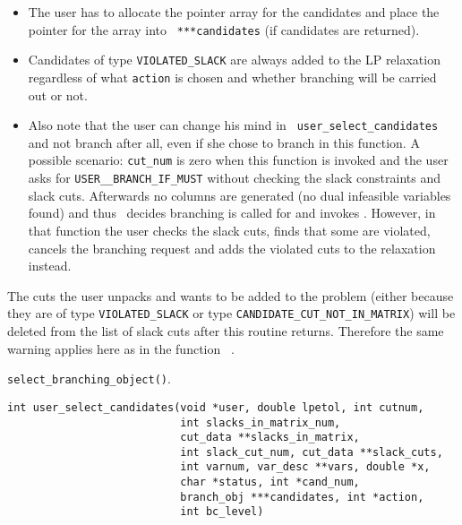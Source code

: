 \item[Notes:] \hfill
\begin{itemize}
	\item The user has to allocate the pointer array for the
	candidates and place the pointer for the array into {\tt
	***candidates} (if candidates are returned).

	\item Candidates of type {\tt VIOLATED\_SLACK} are always
	added to the LP relaxation regardless of what {\tt action} is
	chosen and whether branching will be carried out or not.

	\item Also note that the user can change his mind in 
	{\tt {}
	{user_select_candidates}} and not branch after all, even if
	she chose to branch in this function. A possible scenario:
	{\tt cut\_num} is zero when this function is invoked and the
	user asks for {\tt USER\_\_BRANCH\_IF\_MUST} without checking
	the slack constraints and slack cuts. Afterwards no columns
	are generated (no dual infeasible variables found) and thus
	\BB\ decides branching is called for and invokes 
	{\tt {}}. 
	However, in that function the
	user checks the slack cuts, finds that some are violated,
	cancels the branching request and adds the violated cuts to
	the relaxation instead.
\end{itemize}

\item [\bf Warning:] 

The cuts the user unpacks and wants to be added to the
problem (either because they are of type {\tt VIOLATED\_SLACK} or type
{\tt CANDIDATE\_CUT\_NOT\_IN\_MATRIX}) will be deleted from the list
of slack cuts after this routine returns. Therefore the same
warning applies here as in the function {\tt 
{}}.

\item[Wrapper invoked from:] {\tt select\_branching\_object()}.

\ed

\label{user_select_candidates}
\begin{verbatim}
int user_select_candidates(void *user, double lpetol, int cutnum, 
                           int slacks_in_matrix_num,
                           cut_data **slacks_in_matrix,
                           int slack_cut_num, cut_data **slack_cuts,
                           int varnum, var_desc **vars, double *x, 
                           char *status, int *cand_num, 
                           branch_obj ***candidates, int *action,
                           int bc_level)
\end{verbatim}

